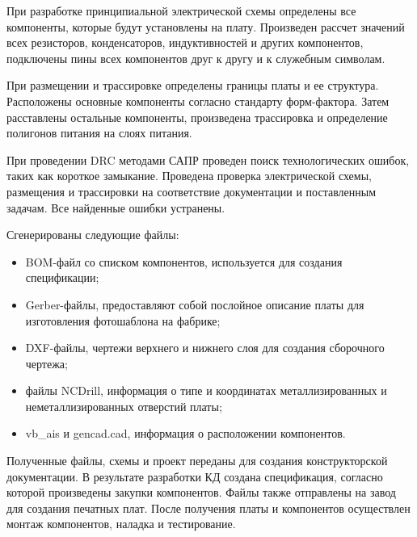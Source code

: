 При разработке принципиальной электрической схемы определены все компоненты, которые будут установлены на плату. Произведен рассчет значений всех резисторов, конденсаторов, индуктивностей и других компонентов, подключены пины всех компонентов друг к другу и к служебным символам.

При размещении и трассировке определены границы платы и ее структура. Расположены основные компоненты согласно стандарту форм-фактора. Затем расставлены остальные компоненты, произведена трассировка и определение полигонов питания на слоях питания.

При проведении DRC методами САПР проведен поиск технологических ошибок, таких как короткое замыкание. Проведена проверка электрической схемы, размещения и трассировки на соответствие документации и поставленным задачам. Все найденные ошибки устранены.

Сгенерированы следующие файлы: \label{output-files}
\begin{itemize}
	\item BOM-файл со списком компонентов, используется для создания спецификации;
	\item Gerber-файлы, предоставляют собой послойное описание платы для изготовления фотошаблона на фабрике;
	\item DXF-файлы, чертежи верхнего и нижнего слоя для создания сборочного чертежа;
	\item файлы NCDrill, информация о типе и координатах металлизированных и неметаллизированных отверстий платы;
	\item vb\_ais и gencad.cad, информация о расположении компонентов.
\end{itemize}

Полученные файлы, схемы и проект переданы для создания конструкторской документации. В результате разработки КД создана спецификация, согласно которой произведены закупки компонентов. Файлы также отправлены на завод для создания печатных плат. После получения платы и компонентов осуществлен монтаж компонентов, наладка и тестирование.

\clearpage
